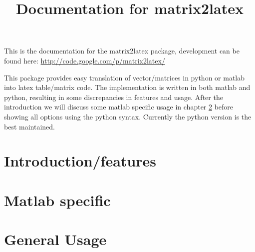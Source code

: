 




\title{Documentation for matrix2latex}


\maketitle
This is the documentation for the matrix2latex package, development can be found here:
\url{http://code.google.com/p/matrix2latex/}

This package provides easy translation of vector/matrices in python or matlab into latex table/matrix code.
The implementation is written in both matlab and python, resulting in some discrepancies in features and usage.
After the introduction we will discuss some
matlab specific usage in chapter \ref{sec:matlab} before showing
all options using the python syntax. Currently the python version is the best maintained.
\chapter{Introduction/features}
\label{sec:introduction}


\chapter{Matlab specific}
\label{sec:matlab}


\chapter{General Usage}
\label{sec:python}


 

